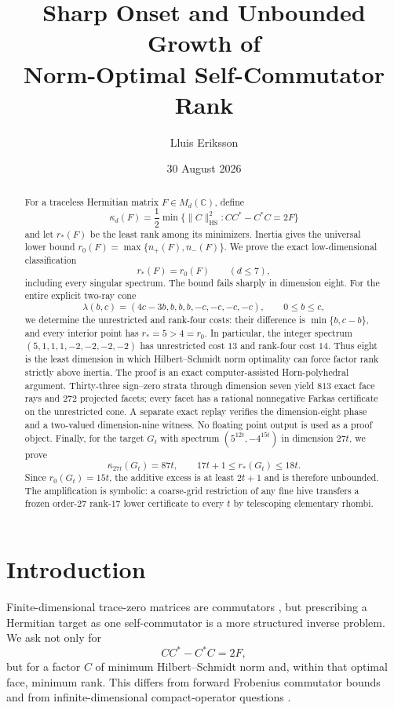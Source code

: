 \documentclass[11pt]{article}
\title{Sharp Onset and Unbounded Growth of\\
Norm-Optimal Self-Commutator Rank}
\author{Lluis Eriksson}
\date{30 August 2026}
\newcommand{\HS}{\mathrm{HS}}
\begin{document}
\maketitle

\begin{abstract}
For a traceless Hermitian matrix $F\in M_d(\mathbb C)$, define
\[
 \kappa_d(F)=\frac12\min\{\|C\|_{\HS}^2:CC^*-C^*C=2F\}
\]
and let $r_*(F)$ be the least rank among its minimizers.  Inertia gives the
universal lower bound $r_0(F)=\max\{n_+(F),n_-(F)\}$.  We prove the exact
low-dimensional classification
\[
 r_*(F)=r_0(F)\qquad(d\le7),
\]
including every singular spectrum.  The bound fails sharply in dimension
eight.  For the entire explicit two-ray cone
\[
 \lambda(b,c)=(4c-3b,b,b,b,-c,-c,-c,-c),\qquad0\le b\le c,
\]
we determine the unrestricted and rank-four costs: their difference is
$\min\{b,c-b\}$, and every interior point has $r_*=5>4=r_0$.  In particular,
the integer spectrum $(5,1,1,1,-2,-2,-2,-2)$ has unrestricted cost $13$ and
rank-four cost $14$.  Thus eight is the least dimension in which
Hilbert--Schmidt norm optimality can force factor rank strictly above inertia.
The proof is an exact computer-assisted Horn-polyhedral argument.  Thirty-three
sign--zero strata through dimension seven yield $813$ exact face rays and
$272$ projected facets; every facet has a rational nonnegative Farkas
certificate on the unrestricted cone.  A separate exact replay verifies the
dimension-eight phase and a two-valued dimension-nine witness.  No floating
point output is used as a proof object.  Finally, for the target $G_t$ with
spectrum $(5^{12t},-4^{15t})$ in dimension $27t$, we prove
\[
 \kappa_{27t}(G_t)=87t,
 \qquad 17t+1\le r_*(G_t)\le18t.
\]
Since $r_0(G_t)=15t$, the additive excess is at least $2t+1$ and is therefore
unbounded.  The amplification is symbolic: a coarse-grid restriction of any
fine hive transfers a frozen order-$27$ rank-$17$ lower certificate to every
$t$ by telescoping elementary rhombi.
\end{abstract}

\section{Introduction}

Finite-dimensional trace-zero matrices are commutators \cite{albert1957}, but prescribing a
Hermitian target as one self-commutator is a more structured inverse problem.
We ask not only for
\[
 CC^*-C^*C=2F,
\]
but for a factor $C$ of minimum Hilbert--Schmidt norm and, within that optimal
face, minimum rank.  This differs from forward Frobenius commutator bounds and
from infinite-dimensional compact-operator questions
\cite{fan1980,weiss1980,beltita2014,bottcher2005}.
\end{document}
